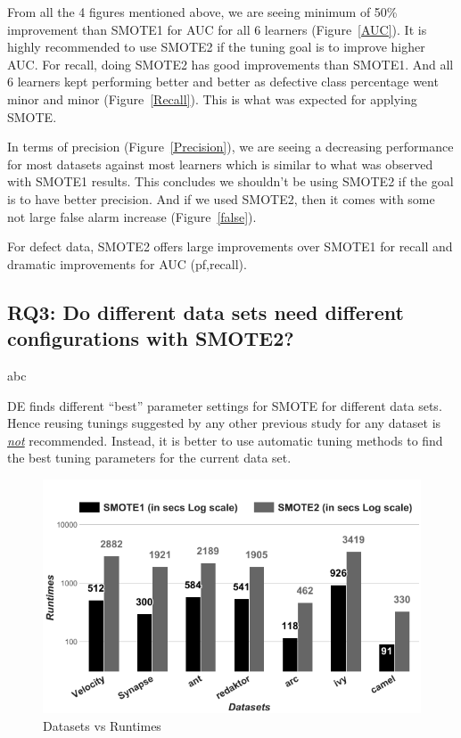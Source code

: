 From all the 4 figures mentioned above, we are seeing minimum of 50\% improvement than SMOTE1 for AUC for all 6 learners (Figure~\ref{AUC}). It is highly recommended to use SMOTE2 if the tuning goal is to improve higher AUC. For recall, doing SMOTE2 has good improvements than SMOTE1. And all 6 learners kept performing better and better as defective class percentage went minor and minor (Figure~\ref{Recall}). This is what was expected for applying SMOTE.

In terms of precision (Figure~\ref{Precision}), we are seeing a decreasing performance for most datasets against most learners which is similar to what was observed with SMOTE1 results. This concludes we shouldn't be using SMOTE2 if the goal is to have better precision. And if we used SMOTE2, then it comes with some not large false alarm increase (Figure~\ref{false}).

\begin{lesson}
    For defect data, SMOTE2  
 offers   large  improvements over SMOTE1 for recall
 and dramatic improvements for AUC (pf,recall).
\end{lesson}

\subsection{\textbf{RQ3: Do different data sets
      need different configurations with SMOTE2?}}

abc

\begin{lesson}
    DE finds different ``best'' parameter settings for SMOTE for different data sets. Hence reusing tunings  suggested  by  any other  previous study  for any dataset is \underline{{\em not}} recommended. Instead,  it is better to
      use  automatic  tuning  methods  to find the best tuning parameters for the current data set.
\end{lesson}

\begin{figure}[!b]
  \captionsetup{justification=centering}
  \includegraphics[width=\linewidth]{./fig/runtimes.png}
  \caption{Datasets vs Runtimes}
  \label{runtime}
\end{figure} 

